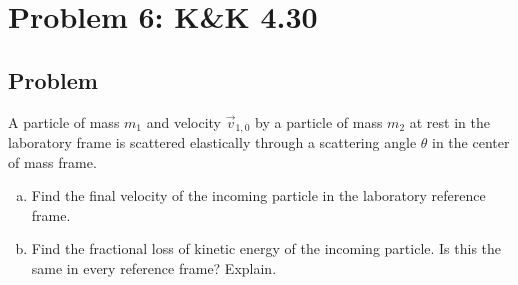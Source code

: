 \documentclass[solutions]{esg8012pset}
\begin{document}
\section*{Problem 6: K\&K 4.30}
\subsection*{Problem}
  A particle of mass $m_1$ and velocity $\vec v_{1,0}$ by a particle of mass $m_2$ at rest in the laboratory frame is scattered elastically through a scattering angle $\theta$ in the center of mass frame.
  \begin{enumerate}[(a)]
    \item Find the final velocity of the incoming particle in the laboratory reference frame.
    \item Find the fractional loss of kinetic energy of the incoming particle. Is this the same in every reference frame? Explain.
  \end{enumerate}
\end{document}
